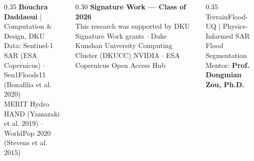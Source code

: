 \documentclass[final]{beamer}
\begin{document}
\begin{frame}[t,fragile]{}

\vspace{0.3cm}
\begin{columns}[c]
  \begin{column}{0.35\textwidth}
    \hspace{1.6cm}
    {\color{white}\small
      \textbf{Bouchra Daddaoui} \;|\; Computation \& Design, DKU\\[2pt]
      Data: Sentinel-1 SAR (ESA Copernicus) $\cdot$ Sen1Floods11 (Bonafilia et al. 2020)\\
      MERIT Hydro HAND (Yamazaki et al. 2019) $\cdot$ WorldPop 2020 (Stevens et al. 2015)}
  \end{column}
  \begin{column}{0.30\textwidth}
    \centering
    {\color{white}\large\bfseries Signature Work — Class of 2026}\\[2pt]
    {\color{white!80}\small
      This research was supported by DKU Signature Work grants $\cdot$
      Duke Kunshan University Computing Cluster (DKUCC) NVIDIA $\cdot$
      ESA Copernicus Open Access Hub}
  \end{column}
  \begin{column}{0.35\textwidth}
    \raggedleft
    {\color{white}\small
      TerrainFlood-UQ $|$ Physics-Informed SAR Flood Segmentation\\[2pt]
      Mentor: \textbf{Prof. Dongmian Zou, Ph.D.}\hspace{1.6cm}}
  \end{column}
\end{columns}

\end{frame}
\end{document}
